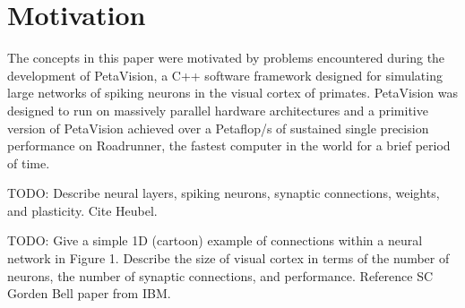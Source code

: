 \section{Motivation}

The concepts in this paper were motivated by problems encountered during
the development of PetaVision, a C++ software framework designed for simulating
large networks of spiking neurons in the visual cortex of primates.  PetaVision
was designed to run on massively parallel hardware architectures and a primitive
version of PetaVision achieved over a Petaflop/s of sustained single precision
performance on Roadrunner, the fastest computer in the world for a brief
period of time.

TODO: Describe neural layers, spiking neurons, synaptic connections, weights,
and plasticity. Cite Heubel.

TODO: Give a simple 1D (cartoon) example of connections within a neural network in
Figure 1.  Describe the size of visual cortex in terms of the number of neurons,
the number of synaptic connections, and performance.  Reference SC Gorden Bell
paper from IBM.
